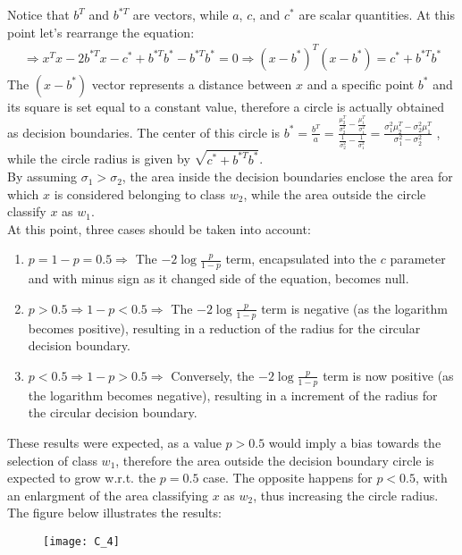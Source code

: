 Notice that \(b^T\) and \(b^{*T}\) are vectors, while \(a\), \(c\), and \(c^*\)
are scalar quantities. At this point let's rearrange the equation:
\begin{align*}
    \Rightarrow
    x^Tx-2b^{*T}x-c^*+b^{*T}b^*-b^{*T}b^*=0
    \Rightarrow
    (x-b^*)^T(x-b^*)=c^*+b^{*T}b^*
\end{align*}
The \((x-b^*)\) vector represents a distance between \(x\) and a specific point \(b^*\)
and its square is set equal to a constant value, therefore a circle is actually
obtained as decision boundaries. The center of this circle is
\(
    b^*=\frac{b^T}{a}
    =\frac{\frac{\mu_2^T}{\sigma_2^2}-\frac{\mu_1^T}{\sigma_1^2}}{\frac{1}{\sigma_2^2}-\frac{1}{\sigma_1^2}}
    =\frac{\sigma_1^2\mu_2^T-\sigma_2^2\mu_1^T}{\sigma_1^2-\sigma_2^2}
\)
, while
the circle radius is given by \(\sqrt{c^*+b^{*T}b^*}\).\\
By assuming \(\sigma_1>\sigma_2\), the area inside the decision boundaries enclose
the area for which \(x\) is considered belonging to class \(w_2\), while the area
outside the circle classify \(x\) as \(w_1\).\\
At this point, three cases should be taken into account:
\begin{enumerate}
    \item \(p=1-p=0.5\Rightarrow\) The \(-2\log{\frac{p}{1-p}}\) term, encapsulated
    into the \(c\) parameter and with minus sign as it changed side of the equation,
    becomes null.
    \item \(p>0.5\Rightarrow 1-p<0.5\Rightarrow\) The \(-2\log{\frac{p}{1-p}}\) term is
    negative (as the logarithm becomes positive), resulting in a reduction of the
    radius for the circular decision boundary.
    \item \(p<0.5\Rightarrow 1-p>0.5\Rightarrow\) Conversely, the \(-2\log{\frac{p}{1-p}}\)
    term is now positive (as the logarithm becomes negative), resulting in a increment
    of the radius for the circular decision boundary.
\end{enumerate}
These results were expected, as a value \(p>0.5\) would imply a bias towards the
selection of class \(w_1\), therefore the area outside the decision boundary circle
is expected to grow w.r.t. the \(p=0.5\) case. The opposite happens for \(p<0.5\),
with an enlargment of the area classifying \(x\) as \(w_2\), thus increasing the
circle radius.\\
The figure below illustrates the results:
\begin{figure}[H]
    \texttt{[image: C\_4]}
    \centering
\end{figure}